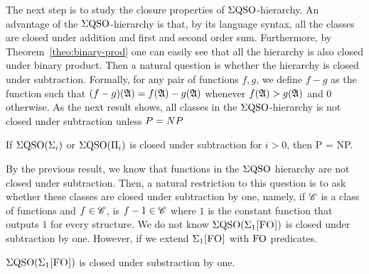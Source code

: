 The next step is to study the closure properties of $\Sigma{\rm QSO}$-hierarchy.
An advantage of the $\Sigma{\rm QSO}$-hierarchy is that, by its language syntax, all the classes are closed under addition and first and second order sum. 
Furthermore, by Theorem~\ref{theo:binary-prod} one can easily see that all the hierarchy is also closed under binary product. 
Then a natural question is whether the hierarchy is closed under subtraction. Formally, for any pair of functions $f,g$, we define $f - g$ as the function such that $(f - g)(\mathfrak{A}) = f(\mathfrak{A})-g(\mathfrak{A})$ whenever $f(\mathfrak{A})>g(\mathfrak{A})$ and $0$ otherwise.
As the next result shows, all classes in the $\Sigma{\rm QSO}$-hierarchy is not closed under subtraction unless ${\sc P} = {\sc NP}$
\begin{theorem} \label{sub-pnp}
If $\Sigma{\rm QSO}(\Sigma_{i})$ or $\Sigma{\rm QSO}(\Pi_{i})$ is closed under subtraction for $i > 0$, then {\sc P} = {\sc NP}.
\end{theorem}

By the previous result, we know that functions in the $\Sigma{\rm QSO}$ hierarchy are not closed under subtraction. Then, a natural restriction to this question is to ask whether these classes are closed under subtraction by one, namely, if $\mathscr{C}$ is a class of functions and $f \in \mathscr{C}$, is $f-1 \in \mathscr{C}$ where $1$ is the constant function that outputs $1$ for every structure. 
We do not know $\Sigma{\rm QSO}(\Sigma_{1}\textsc{[FO]})$ is closed under subtraction by one. However, if we extend $\Sigma_{1}\textsc{[FO]}$ with ${\rm FO}$ predicates.
\begin{theorem} \label{sigmafo-minusone}
	$\Sigma{\rm QSO}(\Sigma_{1}\textsc{[FO]})$ is closed under substraction by one.
\end{theorem}


 





